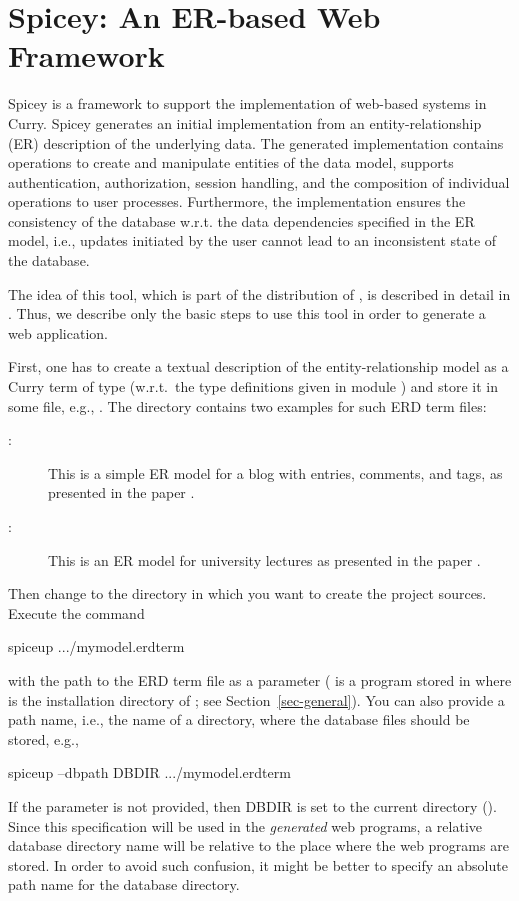 \section{Spicey: An ER-based Web Framework}
\label{sec-spicey}

Spicey is a framework to support the implementation of
web-based systems in Curry. Spicey generates an initial implementation
from an entity-relationship (ER) description of the underlying
data. The generated implementation contains operations to create and
manipulate entities of the data model, supports authentication,
authorization, session handling, and the composition of individual
operations to user processes. Furthermore, the implementation ensures
the consistency of the database w.r.t. the data dependencies specified
in the ER model, i.e., updates initiated by the user cannot lead to an
inconsistent state of the database.

The idea of this tool, which is part of the distribution of \CYS,
is described in detail in \cite{HanusKoschnicke14TPLP}.
Thus, we describe only the basic steps to use this tool
in order to generate a web application.

First, one has to create a textual description of the
entity-relationship model
as a Curry term of type 
(w.r.t.\ the type definitions given in module
)
and store it in some file, e.g., .
The directory 
contains two examples for such ERD term files:
\begin{description}
\item[:]
This is a simple ER model for a blog with entries, comments,
and tags, as presented in the paper \cite{HanusKoschnicke14TPLP}.
\item[:]
This is an ER model for university lectures as
presented in the paper \cite{BrasselHanusMueller08PADL}.
\end{description}
%
Then change to the directory in which you want to create
the project sources.
Execute the command
\begin{curry}
spiceup .../mymodel.erdterm
\end{curry}
with the path to the ERD term file as a parameter
( is a program stored in 
where \cyshome is the installation directory of \CYS;
see Section~\ref{sec-general}).
You can also provide a path name, i.e., the name of a directory,
where the database files should be stored, e.g.,
\begin{curry}
spiceup --dbpath DBDIR .../mymodel.erdterm
\end{curry}
If the parameter  is not provided,
then DBDIR is set to the current directory ().
Since this specification will be used in the \emph{generated} web programs,
a relative database directory name will be relative to the place where
the web programs are stored.
In order to avoid such confusion, it might be better to specify
an absolute path name for the database directory.


